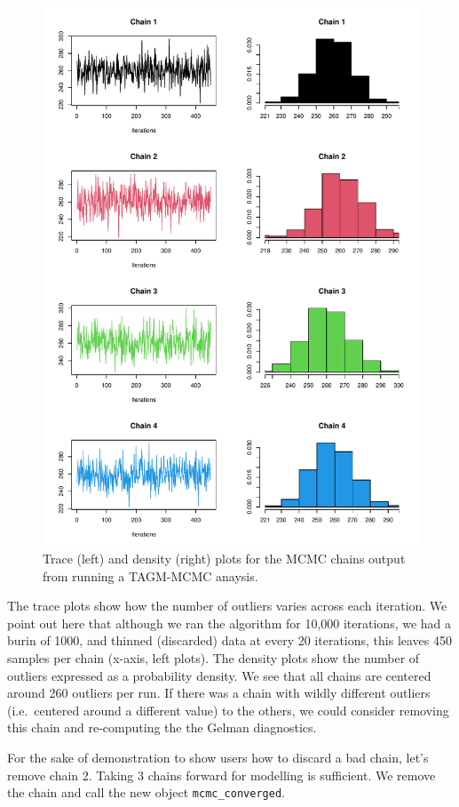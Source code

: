 \documentclass[9pt,a4paper,]{extarticle}
\begin{document}
\begin{figure}[H]

{\centering \includegraphics[width=0.8\linewidth,]{figs/tagm_mcmc_trace_dens} 

}

\caption{Trace (left) and density (right) plots for the MCMC chains output from running a TAGM-MCMC anaysis.}\label{fig:mcmc-figs}
\end{figure}

The trace plots show how the number of outliers varies across each iteration.
We point out here that although we ran the algorithm for 10,000 iterations,
we had a burin of 1000, and thinned (discarded) data at every 20 iterations,
this leaves 450 samples per chain (x-axis, left plots). The density plots show
the number of outliers expressed as a probability density. We see that all chains
are centered around 260 outliers per run. If there was a chain with wildly
different outliers (i.e.~centered around a different value) to the others,
we could consider removing this chain and re-computing the the Gelman diagnostics.

For the sake of demonstration to show users how to discard a bad chain, let's
remove chain 2. Taking 3 chains forward for modelling is sufficient. We remove
the chain and call the new object \texttt{mcmc\_converged}.
\end{document}

